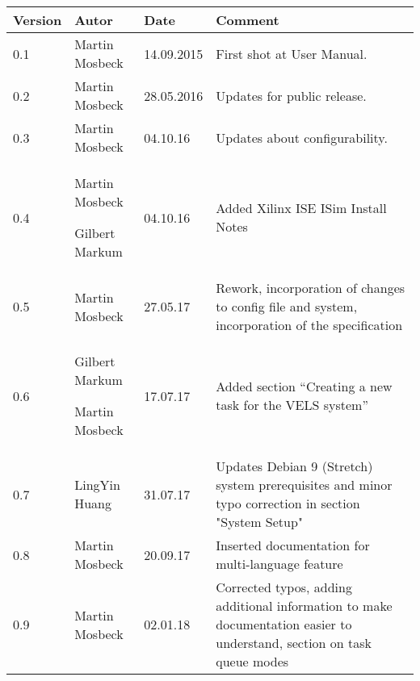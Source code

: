 
\begin{table}[h]
\begin{tabular*}{14.7cm}{|p{}|p{}|p{2cm}|p{}|}
\hline 
Version & Autor & Date & Comment \\[2pt]
\hline
\hline
0.1 & Martin Mosbeck & 14.09.2015 & First shot at User Manual. \\[2pt]
\hline 
0.2 & Martin Mosbeck & 28.05.2016 & Updates for public release. \\[2pt]
\hline 
0.3 & Martin Mosbeck & 04.10.16 & Updates about configurability. \\[2pt]
\hline 
0.4 & Martin Mosbeck \par Gilbert Markum & 04.10.16 & Added Xilinx ISE ISim Install Notes \\[2pt]
\hline 
0.5 & Martin Mosbeck & 27.05.17 & Rework, incorporation of changes to config file and system, incorporation of the 
specification \\[2pt]
\hline
0.6 & Gilbert Markum \par Martin Mosbeck & 17.07.17 & Added section ``Creating a new task for the VELS system'' \\[2pt]
\hline
0.7 & LingYin Huang & 31.07.17 & Updates Debian 9 (Stretch) system prerequisites and minor typo correction in section "System Setup" \\[2pt]
\hline
0.8 & Martin Mosbeck & 20.09.17 & Inserted documentation for multi-language feature \\[2pt]
\hline
0.9 & Martin Mosbeck & 02.01.18 & Corrected typos, adding additional information to make documentation easier to
understand, section on task queue modes  \\[2pt]
\hline
\end{tabular*}
\end{table}

